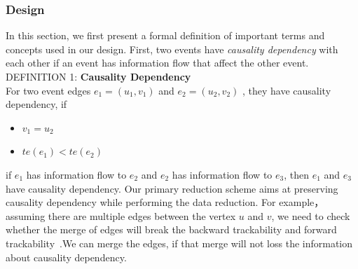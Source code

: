 

\subsubsection{Design}
In this section,  we first present a formal definition of important terms and concepts used in our design.
First, two events have \textit{causality dependency} with each other if an event has information flow that affect the other event.\\
DEFINITION 1: \textbf{Causality Dependency} \\
\indent For two event edges $e_1 = \mathit{(u_1, v_1)} $ and $e_2 = \mathit{(u_2, v_2)} $ , they have causality dependency, if
\begin{itemize}[noitemsep]
	\item $v_1 = u_2 $
	\item $te\mathit{(e_1)} < te\mathit{(e_2)}$
\end{itemize}
if $e_1$ has information flow to $e_2$ and $e_2$  has information flow to $e_3$, then $e_1$ and $e_3$ have causality dependency.
Our primary reduction scheme aims at preserving causality dependency while performing the data reduction. For example， assuming there are multiple edges between the vertex $u$ and $v$, we need to check whether the merge of edges will break the backward trackability and forward trackability~\cite{xu2016high}.We can merge the edges, if that merge will not loss the information about causality dependency.

